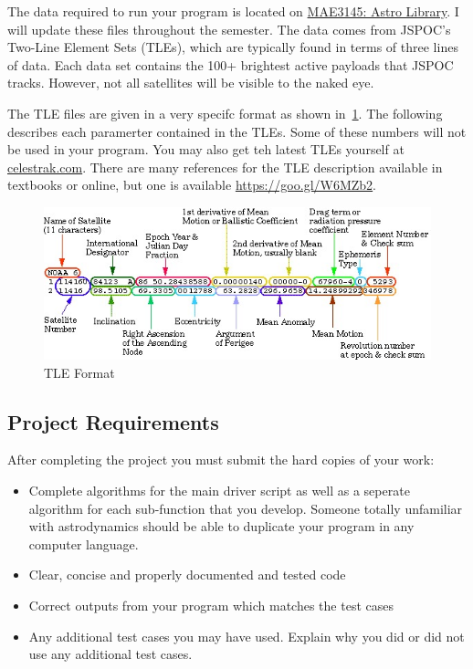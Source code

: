 \documentclass[11pt, reqno]{article}    %
\begin{document}
The data required to run your program is located on \href{https://github.com/fdcl-gwu/MAE3145_library}{MAE3145: Astro Library}.
I will update these files throughout the semester.
The data comes from JSPOC's Two-Line Element Sets (TLEs), which are typically found in terms of three lines of data.
Each data set contains the 100+ brightest active payloads that JSPOC tracks.
However, not all satellites will be visible to the naked eye.

The TLE files are given in a very specifc format as shown in~\cref{fig:tle}. 
The following describes each paramerter contained in the TLEs.
Some of these numbers will not be used in your program. 
You may also get teh latest TLEs yourself at \href{www.clestrak.com}{celestrak.com}.
There are many references for the TLE description available in textbooks or online, but one is available \href{https://goo.gl/W6MZb2}{https://goo.gl/W6MZb2}.

\begin{figure}
    \centering
    \includegraphics[width=\textwidth, keepaspectratio]{figures/tle.jpeg}
    \caption{TLE Format\label{fig:tle}}
\end{figure}
\subsection*{Project Requirements}
After completing the project you must submit the hard copies of your work:
\begin{itemize}
    \item Complete algorithms for the main driver script as well as a seperate algorithm for each sub-function that you develop.
        Someone totally unfamiliar with astrodynamics should be able to duplicate your program in any computer language.
    \item Clear, concise and properly documented and tested code
    \item Correct outputs from your program which matches the test cases
    \item Any additional test cases you may have used. 
        Explain why you did or did not use any additional test cases.
\end{itemize}
\end{document}
